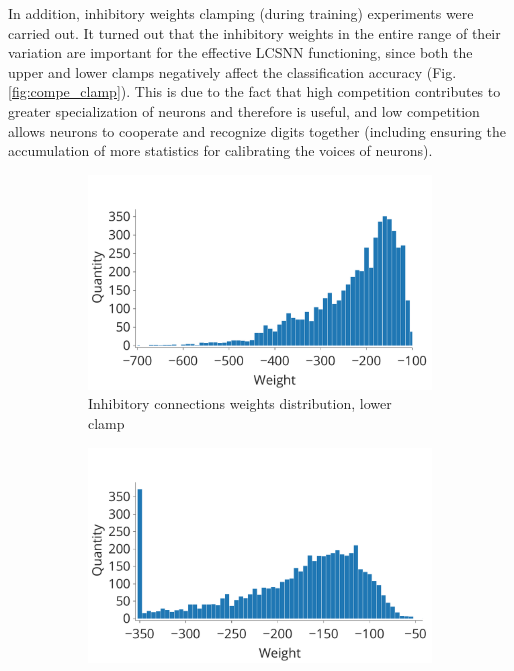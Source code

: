 \documentclass[a4paper,10pt]{article}
\begin{document}
In addition, inhibitory weights clamping (during training) experiments were carried out. It turned out that the inhibitory weights in the entire range of their variation are important for the effective LCSNN functioning, since both the upper and lower clamps negatively affect the classification accuracy (Fig. \ref{fig:compe_clamp}). This is due to the fact that high competition contributes to greater specialization of neurons and therefore is useful, and low competition allows neurons to cooperate and recognize digits together (including ensuring the accumulation of more statistics for calibrating the voices of neurons).

\begin{figure}
\centering 
\begin{subfigure}{0.45\textwidth}
    \includegraphics[width=\textwidth,keepaspectratio=true]{competition_distribution_clamp_low.pdf}
    \caption{Inhibitory connections weights distribution, lower clamp} 
\end{subfigure}
\begin{subfigure}{0.45\textwidth}
    \includegraphics[width=\textwidth,keepaspectratio=true]{competition_distribution_clamp_high.pdf}

\end{subfigure}
\end{figure}
\end{document}
